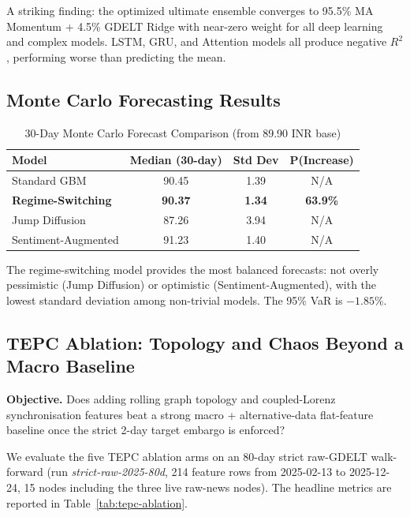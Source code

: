 \documentclass[11pt]{article}
\begin{document}
A striking finding: the optimized ultimate ensemble converges to 95.5\% MA Momentum + 4.5\% GDELT Ridge with near-zero weight for all deep learning and complex models. LSTM, GRU, and Attention models all produce negative $R^2$, performing worse than predicting the mean.

\subsection{Monte Carlo Forecasting Results}

\begin{table}[t]
\centering
\small
\caption{30-Day Monte Carlo Forecast Comparison (from 89.90 INR base)}
\label{tab:montecarlo}
\begin{tabular}{lccc}
\toprule
\textbf{Model} & \textbf{Median (30-day)} & \textbf{Std Dev} & \textbf{P(Increase)} \\
\midrule
Standard GBM & 90.45 & 1.39 & N/A \\
\textbf{Regime-Switching} & \textbf{90.37} & \textbf{1.34} & \textbf{63.9\%} \\
Jump Diffusion & 87.26 & 3.94 & N/A \\
Sentiment-Augmented & 91.23 & 1.40 & N/A \\
\bottomrule
\end{tabular}
\end{table}

The regime-switching model provides the most balanced forecasts: not overly pessimistic (Jump Diffusion) or optimistic (Sentiment-Augmented), with the lowest standard deviation among non-trivial models. The 95\% VaR is $-1.85$\%.

\subsection{TEPC Ablation: Topology and Chaos Beyond a Macro Baseline}
\label{sec:tepc-results}

\textbf{Objective.} Does adding rolling graph topology and coupled-Lorenz synchronisation features beat a strong macro + alternative-data flat-feature baseline once the strict 2-day target embargo is enforced?

We evaluate the five TEPC ablation arms on an 80-day strict raw-GDELT walk-forward (run \textit{strict-raw-2025-80d}, 214 feature rows from \mbox{2025-02-13} to \mbox{2025-12-24}, 15 nodes including the three live raw-news nodes). The headline metrics are reported in Table~\ref{tab:tepc-ablation}.
\end{document}
